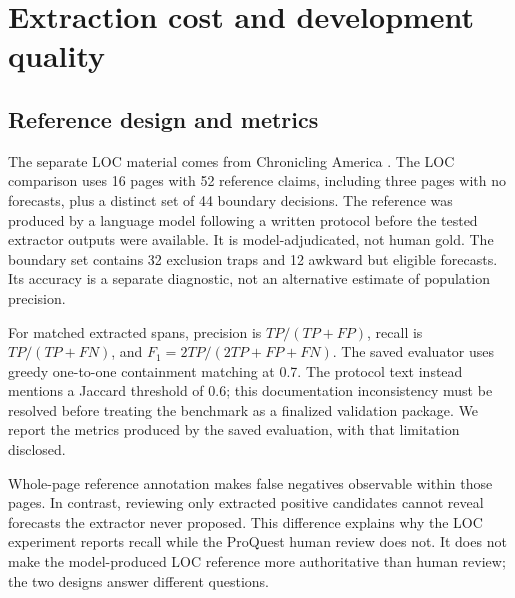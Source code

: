 \section{Extraction cost and development quality}
\subsection{Reference design and metrics}
The separate LOC material comes from Chronicling America \citep{loc}. The LOC comparison uses 16 pages with 52 reference claims, including three pages with no forecasts, plus a distinct set of 44 boundary decisions. The reference was produced by a language model following a written protocol before the tested extractor outputs were available. It is model-adjudicated, not human gold. The boundary set contains 32 exclusion traps and 12 awkward but eligible forecasts. Its accuracy is a separate diagnostic, not an alternative estimate of population precision.

For matched extracted spans, precision is $TP/(TP+FP)$, recall is $TP/(TP+FN)$, and $F_1=2TP/(2TP+FP+FN)$. The saved evaluator uses greedy one-to-one containment matching at 0.7. The protocol text instead mentions a Jaccard threshold of 0.6; this documentation inconsistency must be resolved before treating the benchmark as a finalized validation package. We report the metrics produced by the saved evaluation, with that limitation disclosed.

Whole-page reference annotation makes false negatives observable within those pages. In contrast, reviewing only extracted positive candidates cannot reveal forecasts the extractor never proposed. This difference explains why the LOC experiment reports recall while the ProQuest human review does not. It does not make the model-produced LOC reference more authoritative than human review; the two designs answer different questions.

